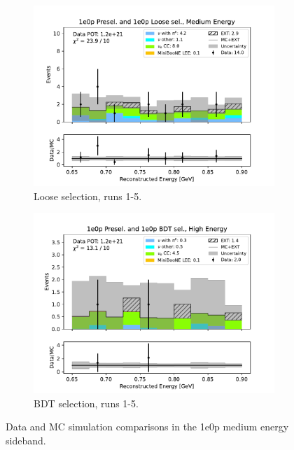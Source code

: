 \begin{figure}[H]
\begin{subfigure}{0.33\linewidth}
        \includegraphics[width=\linewidth]{technote/Sidebands/Figures/NearSideband/near_sideband_reco_e_run1234a4b4c4d5_ZP_ZPLOOSESEL_MEDIUM_ENERGY.pdf}
        \caption{Loose selection, runs 1-5.}
    \end{subfigure}%
    \begin{subfigure}{0.33\linewidth}
        \includegraphics[width=\linewidth]{technote/Sidebands/Figures/NearSideband/near_sideband_reco_e_run1234a4b4c4d5_ZP_ZPBDT_MEDIUM_ENERGY.pdf}
        \caption{BDT selection, runs 1-5.}
    \end{subfigure}
    \caption{Data and MC simulation comparisons in the 1e0p medium energy sideband.}
\end{figure}

